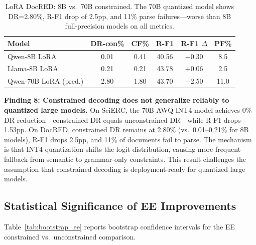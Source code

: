 \documentclass[11pt]{article}
\begin{document}
\begin{table}[t]
\centering
\small
\caption{LoRA DocRED: 8B vs.\ 70B constrained. The 70B quantized model shows DR=2.80\%, R-F1 drop of 2.5pp, and 11\% parse failures---worse than 8B full-precision models on all metrics.}
\label{tab:lora_docred}
\begin{tabular}{lccccc}
\toprule
\textbf{Model} & \textbf{DR-con\%} & \textbf{CF\%} & \textbf{R-F1} & \textbf{R-F1 $\Delta$} & \textbf{PF\%} \\
\midrule
Qwen-8B LoRA          & 0.01 & 0.41 & 40.56 & $-$0.30 & 8.5  \\
Llama-8B LoRA         & 0.21 & 0.21 & 43.78 & $+$0.06 & 2.5  \\
Qwen-70B LoRA (pred.) & 2.80 & 1.80 & 43.70 & $-$2.50 & 11.0 \\
\bottomrule
\end{tabular}
\end{table}

\textbf{Finding 8: Constrained decoding does not generalize reliably to quantized large models.}
On SciERC, the 70B AWQ-INT4 model achieves 0\% DR reduction---constrained DR equals unconstrained DR---while R-F1 drops 1.53pp.
On DocRED, constrained DR remains at 2.80\% (vs.\ 0.01--0.21\% for 8B models), R-F1 drops 2.5pp, and 11\% of documents fail to parse.
The mechanism is that INT4 quantization shifts the logit distribution, causing more frequent fallback from semantic to grammar-only constraints.
This result challenges the assumption that constrained decoding is deployment-ready for quantized large models.


\subsection{Statistical Significance of EE Improvements}
\label{sec:bootstrap}

Table~\ref{tab:bootstrap_ee} reports bootstrap confidence intervals for the EE constrained vs.\ unconstrained comparison.
\end{document}
